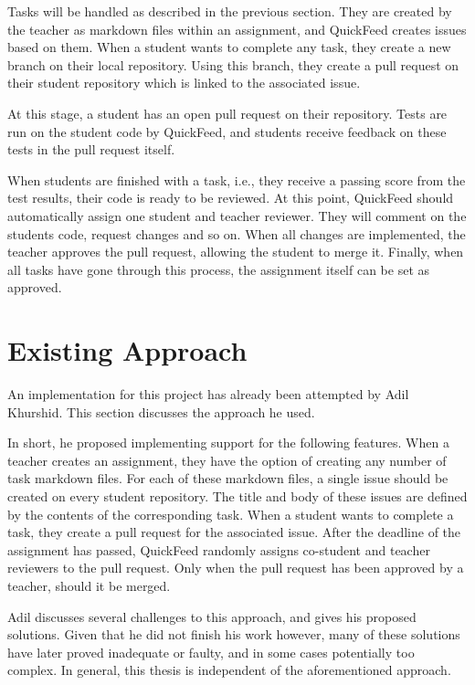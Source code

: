 Tasks will be handled as described in the previous section.
They are created by the teacher as markdown files within an assignment, and QuickFeed creates issues based on them.
When a student wants to complete any task, they create a new branch on their local repository.
Using this branch, they create a pull request on their student repository which is linked to the associated issue.

At this stage, a student has an open pull request on their repository.
Tests are run on the student code by QuickFeed, and students receive feedback on these tests in the pull request itself.

When students are finished with a task, i.e., they receive a passing score from the test results, their code is ready to be reviewed.
At this point, QuickFeed should automatically assign one student and teacher reviewer.
They will comment on the students code, request changes and so on.
When all changes are implemented, the teacher approves the pull request, allowing the student to merge it.
Finally, when all tasks have gone through this process, the assignment itself can be set as approved.

\section{Existing Approach}

An implementation for this project has already been attempted by Adil Khurshid. %
This section discusses the approach he used.

In short, he proposed implementing support for the following features.
When a teacher creates an assignment, they have the option of creating any number of task markdown files.
For each of these markdown files, a single issue should be created on every student repository.
The title and body of these issues are defined by the contents of the corresponding task.
When a student wants to complete a task, they create a pull request for the associated issue.
After the deadline of the assignment has passed, QuickFeed randomly assigns co-student and teacher reviewers to the pull request. 
Only when the pull request has been approved by a teacher, should it be merged.

Adil discusses several challenges to this approach, and gives his proposed solutions.
Given that he did not finish his work however, many of these solutions have later proved inadequate or faulty, and in some cases potentially too complex.
In general, this thesis is independent of the aforementioned approach.

